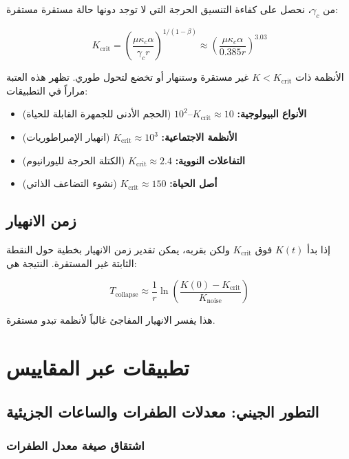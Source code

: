 \documentclass[11pt,a4paper]{article}
\newcommand{\Keffcrit}{K_{\mathrm{crit}}}
\newcommand{\kappac}{\kappa_c}
\begin{document}
	من \(\gamma_c\)، نحصل على كفاءة التنسيق الحرجة التي لا توجد دونها حالة مستقرة مستقرة:
	
	\begin{equation}
		\Keffcrit = \left( \frac{\mu \kappac \alpha}{\gamma_c r} \right)^{1/(1-\beta)} \approx \left( \frac{\mu \kappac \alpha}{0.385 r} \right)^{3.03}
		\label{eq:Kcrit}
	\end{equation}
	
	الأنظمة ذات \(K < \Keffcrit\) غير مستقرة وستنهار أو تخضع لتحول طوري. تظهر هذه العتبة مراراً في التطبيقات:
	
	\begin{itemize}
		\item \textbf{الأنواع البيولوجية:} \(\Keffcrit \approx 10\)--\(10^2\) (الحجم الأدنى للجمهرة القابلة للحياة)
		\item \textbf{الأنظمة الاجتماعية:} \(\Keffcrit \approx 10^3\) (انهيار الإمبراطوريات)
		\item \textbf{التفاعلات النووية:} \(\Keffcrit \approx 2.4\) (الكتلة الحرجة لليورانيوم)
		\item \textbf{أصل الحياة:} \(\Keffcrit \approx 150\) (نشوء التضاعف الذاتي)
	\end{itemize}
	
	\subsection{زمن الانهيار}
	
	إذا بدأ \(K(t)\) فوق \(\Keffcrit\) ولكن بقربه، يمكن تقدير زمن الانهيار بخطية حول النقطة الثابتة غير المستقرة. النتيجة هي:
	
	\begin{equation}
		T_{\text{collapse}} \approx \frac{1}{r} \ln\left( \frac{K(0) - \Keffcrit}{K_{\text{noise}}} \right)
		\label{eq:collapse-time}
	\end{equation}
	
	هذا يفسر الانهيار المفاجئ غالباً لأنظمة تبدو مستقرة.
	
	\section{تطبيقات عبر المقاييس}
	\label{sec:applications}
	
	\subsection{التطور الجيني: معدلات الطفرات والساعات الجزيئية}
	\label{subsec:genetic}
	
	\subsubsection{اشتقاق صيغة معدل الطفرات}
	
\end{document}
